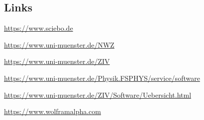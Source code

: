 \begin{multicols*}{2}
\subsection{Links}
\begin{flushleft}
	\begin{fibelurl}
		\url{https://www.sciebo.de}
		\label{internet:sciebo}
	\end{fibelurl}
	\begin{fibelurl}
		\url{https://www.uni-muenster.de/NWZ}
		\label{internet:ivvnwz}
	\end{fibelurl}
	\begin{fibelurl}
		\url{https://www.uni-muenster.de/ZIV}
		\label{internet:ziv}
	\end{fibelurl}
	\begin{fibelurl}
		\url{https://www.uni-muenster.de/Physik.FSPHYS/service/software}
		\label{internet:fsphys_software}
	\end{fibelurl}
	\begin{fibelurl}
		\url{https://www.uni-muenster.de/ZIV/Software/Uebersicht.html}
		\label{internet:ziv_software}
	\end{fibelurl}
	\begin{fibelurl}
		\url{https://www.wolframalpha.com}
		\label{internet:wolfram_alpha}
	\end{fibelurl}
\end{flushleft}


\medskip

\begin{center}
\end{center}
\end{multicols*}

